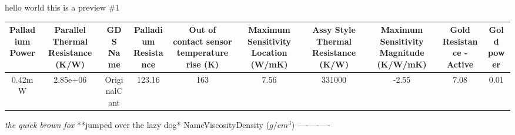 \documentclass[]{article}
\begin{document}
hello world this is a preview \#1

\begin{tabular}{cccccccccc}
\hline
  Palladium Power  &  Parallel Thermal Resistance (K/W)  &   GDS Name   &  Palladium Resistance  &  Out of contact sensor temperature rise (K)  &  Maximum Sensitivity Location (W/mK)  &  Assy Style Thermal Resistance (K/W)  &  Maximum Sensitivity Magnitude (K/W/mK)  &  Gold Resistance - Active  &  Gold power  \\
\hline
      0.42mW       &              2.85e+06               & OriginalCant &         123.16         &                     163                      &                 7.56                  &                331000                 &                  -2.55                   &            7.08            &     0.01     \\
\hline
\end{tabular}


\emph{the quick brown fox} **jumped over the lazy dog*
\textbar{}Name\textbar{}Viscosity\textbar{}Density ($g/cm^3$)
\textbar{}----\textbar{}----\textbar{}----\textbar{}
\end{document}
